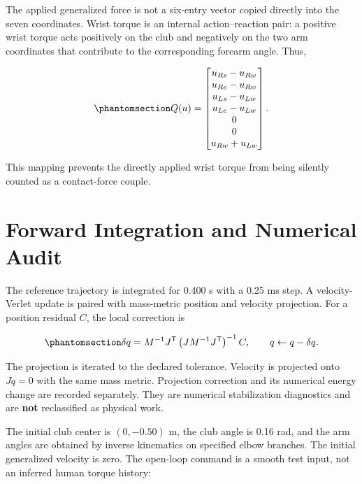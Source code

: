 \documentclass[
  letterpaper,
]{report}
\begin{document}
The applied generalized force is not a six-entry vector copied directly
into the seven coordinates. Wrist torque is an internal action--reaction
pair: a positive wrist torque acts positively on the club and negatively
on the two arm coordinates that contribute to the corresponding forearm
angle. Thus,

\begin{equation}\phantomsection\label{eq-forward-two-hand-control-map}{
Q(u)=
\begin{bmatrix}
u_{Rs}-u_{Rw}\\
u_{Re}-u_{Rw}\\
u_{Ls}-u_{Lw}\\
u_{Le}-u_{Lw}\\
0\\0\\
u_{Rw}+u_{Lw}
\end{bmatrix}.
}\end{equation}

This mapping prevents the directly applied wrist torque from being
silently counted as a contact-force couple.

\section{Forward Integration and Numerical
Audit}\label{sec-forward-two-hand-integration}

The reference trajectory is integrated for 0.400 s with a 0.25 ms step.
A velocity-Verlet update is paired with mass-metric position and
velocity projection. For a position residual \(C\), the local correction
is

\begin{equation}\phantomsection\label{eq-forward-two-hand-projection}{
\delta q = M^{-1}J^{\mathsf T}
\left(JM^{-1}J^{\mathsf T}\right)^{-1}C,
\qquad q\leftarrow q-\delta q.
}\end{equation}

The projection is iterated to the declared tolerance. Velocity is
projected onto \(J\dot q=0\) with the same mass metric. Projection
correction and its numerical energy change are recorded separately. They
are numerical stabilization diagnostics and are \textbf{not}
reclassified as physical work.

The initial club center is \((0,-0.50)\) m, the club angle is 0.16 rad,
and the arm angles are obtained by inverse kinematics on specified elbow
branches. The initial generalized velocity is zero. The open-loop
command is a smooth test input, not an inferred human torque history:
\end{document}
